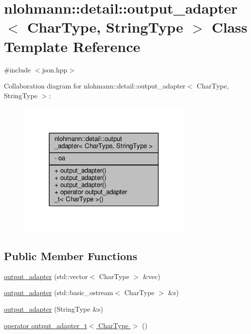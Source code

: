 \hypertarget{classnlohmann_1_1detail_1_1output__adapter}{}\section{nlohmann\+:\+:detail\+:\+:output\+\_\+adapter$<$ Char\+Type, String\+Type $>$ Class Template Reference}
\label{classnlohmann_1_1detail_1_1output__adapter}


{\ttfamily \#include $<$json.\+hpp$>$}



Collaboration diagram for nlohmann\+:\+:detail\+:\+:output\+\_\+adapter$<$ Char\+Type, String\+Type $>$\+:
\nopagebreak
\begin{figure}[H]
\begin{center}
\leavevmode
\includegraphics[width=248pt]{classnlohmann_1_1detail_1_1output__adapter__coll__graph}
\end{center}
\end{figure}
\subsection*{Public Member Functions}
\begin{DoxyCompactItemize}
\item 
\hyperlink{classnlohmann_1_1detail_1_1output__adapter_a05a30a77b568fd84676078d938cbd484}{output\+\_\+adapter} (std\+::vector$<$ Char\+Type $>$ \&vec)
\item 
\hyperlink{classnlohmann_1_1detail_1_1output__adapter_a43b3ba852e6a2c3f4d312543bb04c00d}{output\+\_\+adapter} (std\+::basic\+\_\+ostream$<$ Char\+Type $>$ \&s)
\item 
\hyperlink{classnlohmann_1_1detail_1_1output__adapter_a6ad59d1ec534383b430cd7ef8a518539}{output\+\_\+adapter} (String\+Type \&s)
\item 
\hyperlink{classnlohmann_1_1detail_1_1output__adapter_a5fdac7aec8ade2f4bb0b5df30550d90c}{operator output\+\_\+adapter\+\_\+t$<$ Char\+Type $>$} ()
\end{DoxyCompactItemize}
